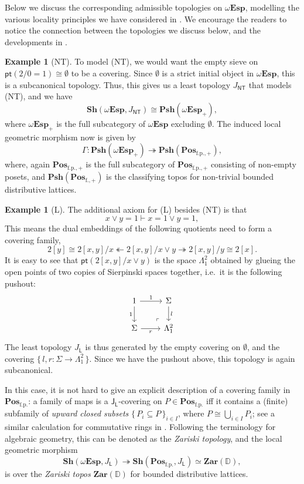 \documentclass[12pt]{amsart}
\theoremstyle{definition}
\newtheorem{example}[theorem]{Example}
\newcommand{\mb}[1]{\mathbf{#1}}
\newcommand{\mbb}[1]{\mathbb{#1}}
\newcommand{\mr}[1]{\mathrm{#1}}
\newcommand{\ms}[1]{\mathsf{#1}}
\newcommand{\Pos}{\mb{Pos}}
\newcommand{\sh}{\mb{Sh}}
\newcommand{\psh}{\mb{Psh}}
\newcommand{\set}[1]{\{\,#1\,\}}
\newcommand{\surj}{\twoheadrightarrow}
\newcommand{\fp}{_{\mr{f.p.}}}
\newcommand{\emp}{\emptyset}
\newcommand{\pt}{\ms{pt}}
\newcommand{\wTop}{\omega\mb{Esp}}
\begin{document}
Below we discuss the corresponding admissible topologies on $\wTop$, modelling the various locality principles we have considered in . We encourage the readers to notice the connection between the topologies we discuss below, and the developments in .

\begin{example}[NT]
  To model (NT), we would want the empty sieve on $\pt(2/0=1) \cong \emp$ to be a covering. Since $\emp$ is a strict initial object in $\wTop$, this is a subcanonical topology. Thus, this gives us a least topology $J_{\ms{NT}}$ that models (NT), and we have
  \[ \sh(\wTop,J_{\ms{NT}}) \cong \psh(\wTop_+), \]
  where $\wTop_+$ is the full subcategory of $\wTop$ excluding $\emp$. The induced local geometric morphism now is given by 
  \[ \Gamma \colon \psh(\wTop_+) \surj \psh(\Pos_{\mr{f.p.,+}}), \]
  where, again $\Pos_{\mr{f.p.,+}}$ is the full subcategory of $\Pos_{\mr{f.p.,+}}$ consisting of non-empty posets, and $\psh(\Pos_{\mr{f.,+}})$ is the classifying topos for non-trivial bounded distributive lattices.
\end{example}

\begin{example}[L]
  The additional axiom for (L) besides (NT) is that 
  \[ x \vee y = 1 \vdash x = 1 \vee y = 1, \] 
  This means the dual embeddings of the following quotients need to form a covering family,
  \[ 2[y] \cong 2[x,y]/x \twoheadleftarrow 2[x,y]/x\vee y \surj 2[x,y]/y \cong 2[x]. \]
  It is easy to see that $\pt(2[x,y]/x \vee y)$ is the space $\Lambda^2_1$ obtained by glueing the open points of two copies of Sierpinski spaces together, i.e.\ it is the following pushout:
  \[
  \begin{tikzcd}
    1 \ar[d, "1"'] \ar[r, "1"] & \Sigma \ar[d, "l"] \\ 
    \Sigma \ar[r, "r"'] & \Lambda^2_1
    \arrow["\lrcorner"{anchor=center, pos=0.125, rotate=180}, draw=none, from=2-2, to=1-1]    
  \end{tikzcd}
  \]
  The least topology $J_{\ms L}$ is thus generated by the empty covering on $\emp$, and the covering $\set{l,r : \Sigma \to \Lambda^2_1}$. Since we have the pushout above, this topology is again subcanonical. 
  
  In this case, it is not hard to give an explicit description of a covering family in $\Pos\fp$: a family of maps is a $\ms J_{\ms L}$-covering on $P \in \Pos\fp$ iff it contains a (finite) subfamily of \emph{upward closed subsets} $\set{P_i\subseteq P}_{i\in I}$, where $P \cong \bigcup_{i\in I}P_i$; see a similar calculation for commutative rings in \citet[VIII. 6]{maclane1992sheaves}. Following the terminology for algebraic geometry, this can be denoted as the \emph{Zariski topology}, and the local geometric morphism
  \[ \sh(\wTop,J_{\ms L}) \surj \sh(\Pos\fp,J_{\ms L}) \simeq \mb{Zar}(\mbb D), \]
  is over the \emph{Zariski topos} $\mb{Zar}(\mbb D)$ for bounded distributive lattices.
\end{example}
\end{document}
